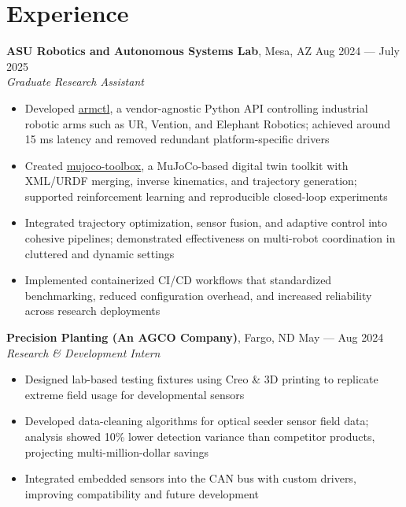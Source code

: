 \documentclass[10pt]{article}
\begin{document}
\section*{Experience}
\textbf{ASU Robotics and Autonomous Systems Lab}, Mesa, AZ \hfill Aug 2024 --- July 2025 \\
\textit{Graduate Research Assistant}
\begin{itemize}
  \item Developed \href{https://github.com/MGross21/armctl}{armctl}, a vendor-agnostic Python API controlling industrial robotic arms such as UR, Vention, and Elephant Robotics; achieved around 15 ms latency and removed redundant platform-specific drivers
  \item Created \href{https://github.com/MGross21/mujoco-toolbox}{mujoco-toolbox}, a MuJoCo-based digital twin toolkit with XML/URDF merging, inverse kinematics, and trajectory generation; supported reinforcement learning and reproducible closed-loop experiments
  \item Integrated trajectory optimization, sensor fusion, and adaptive control into cohesive pipelines; demonstrated effectiveness on multi-robot coordination in cluttered and dynamic settings
  \item Implemented containerized CI/CD workflows that standardized benchmarking, reduced configuration overhead, and increased reliability across research deployments
\end{itemize}
\vspace{0.5em}
\textbf{Precision Planting (An AGCO Company)}, Fargo, ND \hfill May --- Aug 2024 \\
\textit{Research \& Development Intern}
\begin{itemize}
  \item Designed lab-based testing fixtures using Creo \& 3D printing to replicate extreme field usage for developmental sensors
  \item Developed data-cleaning algorithms for optical seeder sensor field data; analysis showed 10\% lower detection variance than competitor products, projecting multi-million-dollar savings
  \item Integrated embedded sensors into the CAN bus with custom drivers, improving compatibility and future development
\end{itemize}
\end{document}
